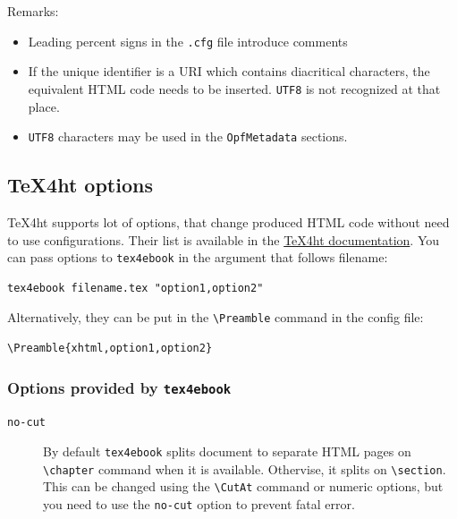 Remarks:

\begin{itemize}
\tightlist
\item
  Leading percent signs in the \texttt{.cfg} file introduce comments
\item
  If the unique identifier is a URI which contains diacritical
  characters, the\\
  equivalent HTML code needs to be inserted. \texttt{UTF8} is not
  recognized at that place.
\item
  \texttt{UTF8} characters may be used in the \texttt{OpfMetadata}
  sections.
\end{itemize}

\hypertarget{ht-options}{%
\subsection{\texorpdfstring{\TeX4ht
options}{4ht options}}\label{ht-options}}

\TeX4ht supports lot of options, that change produced HTML code without
need to use configurations. Their list is available in the
\href{https://www.kodymirus.cz/tex4ht-doc/texfourhtOptions.html}{\TeX4ht
documentation}. You can pass options to \texttt{tex4ebook} in the
argument that follows filename:

\begin{verbatim}
tex4ebook filename.tex "option1,option2"
\end{verbatim}

Alternatively, they can be put in the \texttt{\textbackslash{}Preamble}
command in the config file:

\begin{verbatim}
\Preamble{xhtml,option1,option2}
\end{verbatim}

\hypertarget{options-provided-by-tex4ebook}{%
\subsubsection{\texorpdfstring{Options provided by
\texttt{tex4ebook}}{Options provided by tex4ebook}}\label{options-provided-by-tex4ebook}}

\begin{description}
\item[\texttt{no-cut}]
By default \texttt{tex4ebook} splits document to separate HTML pages on
\texttt{\textbackslash{}chapter} command when it is available.
Othervise, it splits on \texttt{\textbackslash{}section}. This can be
changed using the \texttt{\textbackslash{}CutAt} command or numeric
options, but you need to use the \texttt{no-cut} option to prevent fatal
error.
\end{description}

